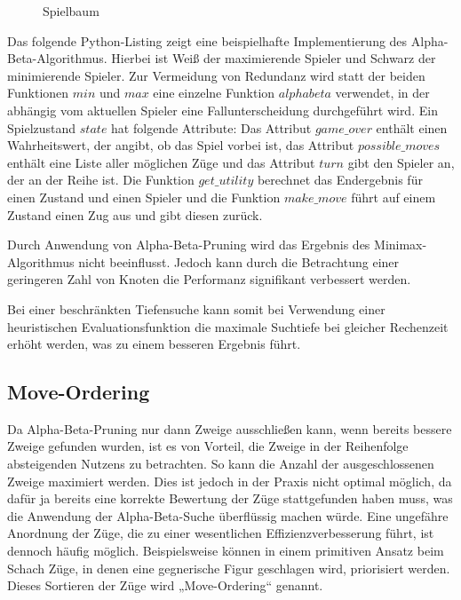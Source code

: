 \begin{figure}
    \centering
    \caption{Spielbaum}
    \label{fig:game_tree_ab_pruning}
\end{figure}

Das folgende Python-Listing zeigt eine beispielhafte Implementierung des Alpha-Beta-Algorithmus. Hierbei ist Weiß der
maximierende Spieler und Schwarz der minimierende Spieler. Zur Vermeidung von Redundanz wird statt der beiden Funktionen
$min$ und $max$ eine einzelne Funktion $alphabeta$ verwendet, in der abhängig vom aktuellen Spieler eine
Fallunterscheidung durchgeführt wird. Ein Spielzustand $state$ hat folgende Attribute: Das Attribut $game\_over$ enthält
einen Wahrheitswert, der angibt, ob das Spiel vorbei ist, das Attribut $possible\_moves$ enthält eine Liste aller
möglichen Züge und das Attribut $turn$ gibt den Spieler an, der an der Reihe ist. Die Funktion $get\_utility$ berechnet
das Endergebnis für einen Zustand und einen Spieler und die Funktion $make\_move$ führt auf einem Zustand einen Zug aus
und gibt diesen zurück.



Durch Anwendung von Alpha-Beta-Pruning wird das Ergebnis des Minimax-Algorithmus nicht beeinflusst. Jedoch kann durch
die Betrachtung einer geringeren Zahl von Knoten die Performanz signifikant verbessert werden.
\cite[S.~167]{ai2010russel}

Bei einer beschränkten Tiefensuche kann somit bei Verwendung einer heuristischen Evaluationsfunktion die maximale
Suchtiefe bei gleicher Rechenzeit erhöht werden, was zu einem besseren Ergebnis führt.

\subsection{Move-Ordering}
Da Alpha-Beta-Pruning nur dann Zweige ausschließen kann, wenn bereits bessere Zweige gefunden wurden, ist es von
Vorteil, die Zweige in der Reihenfolge absteigenden Nutzens zu betrachten. So kann die Anzahl der ausgeschlossenen
Zweige maximiert werden. Dies ist jedoch in der Praxis nicht optimal möglich, da dafür ja bereits eine korrekte
Bewertung der Züge stattgefunden haben muss, was die Anwendung der Alpha-Beta-Suche überflüssig machen würde. Eine
ungefähre Anordnung der Züge, die zu einer wesentlichen Effizienzverbesserung führt, ist dennoch häufig möglich.
Beispielsweise können in einem primitiven Ansatz beim Schach Züge, in denen eine gegnerische Figur geschlagen wird,
priorisiert werden. Dieses Sortieren der Züge wird „Move-Ordering“ genannt.
\cite[S.~169]{ai2010russel}

